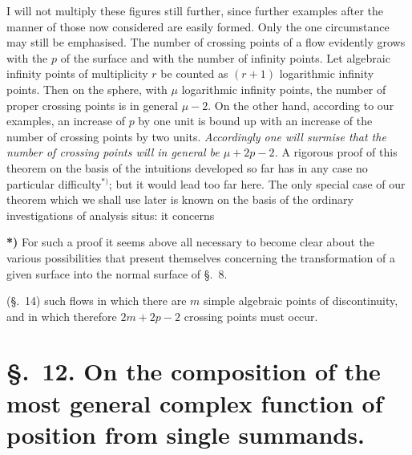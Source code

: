 \documentclass{article}
\begin{document}

I will not multiply these figures still further, since further examples after the manner of those now considered are easily formed. Only the one circumstance may still be emphasised. The number of crossing points of a flow evidently grows with the $p$ of the surface and with the number of infinity points. Let algebraic infinity points of multiplicity $r$ be counted as $(r + 1)$ logarithmic infinity points. Then on the sphere, with $\mu$ logarithmic infinity points, the number of proper crossing points is in general $\mu - 2$. On the other hand, according to our examples, an increase of $p$ by one unit is bound up with an increase of the number of crossing points by two units. \emph{Accordingly one will surmise that the number of crossing points will in general be $\mu + 2p - 2$.} A rigorous proof of this theorem on the basis of the intuitions developed so far has in any case no particular difficulty${}^{*)}$; but it would lead too far here. The only special case of our theorem which we shall use later is known on the basis of the ordinary investigations of analysis situs: it concerns

\textbf{*)} For such a proof it seems above all necessary to become clear about the various possibilities that present themselves concerning the transformation of a given surface into the normal surface of §.~8.

(§.~14) such flows in which there are $m$ simple algebraic points of discontinuity, and in which therefore $2m + 2p - 2$ crossing points must occur.

\section*{§.~12. On the composition of the most general complex function of position from single summands.}
\end{document}
